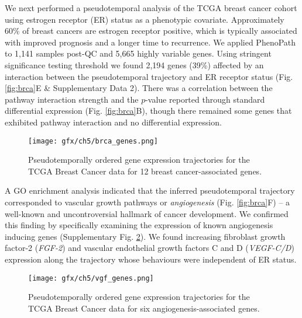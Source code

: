 We next performed a pseudotemporal analysis of the TCGA breast cancer cohort using estrogen receptor (ER) status as a phenotypic covariate. Approximately 60\% of breast cancers are estrogen receptor positive\cite{Early_Breast_Cancer_Trialists_Collaborative_Group_EBCTCG_undated-ux}, which is typically associated with improved prognosis and a longer time to recurrence\cite{Parl1984-fo}. We applied PhenoPath to 1,141 samples post-QC and 5,665 highly variable genes. Using stringent significance testing threshold we found 2,194 genes (39\%) affected by an interaction between the pseudotemporal trajectory and ER receptor status (Fig. \ref{fig:brca}E \& Supplementary Data 2).
 There was a correlation between the pathway interaction strength and the $p$-value reported through standard differential expression (Fig. \ref{fig:brca}B), though there remained some genes that exhibited pathway interaction and no differential expression.

\begin{figure}
   \texttt{[image: gfx/ch5/brca\_genes.png]}
   \caption{Pseudotemporally ordered gene expression trajectories for the TCGA Breast Cancer data for 12 breast cancer-associated genes.}
	\label{fig:brca_genes}
\end{figure}

A GO enrichment analysis indicated that the inferred pseudotemporal trajectory corresponded to vascular growth pathways or \emph{angiogenesis} (Fig. \ref{fig:brca}F) -- a well-known and uncontroversial hallmark of cancer development.\cite{ferrara2002vegf,welti2013recent} We confirmed this finding by specifically examining the expression of known angiogenesis inducing genes (Supplementary Fig. \ref{fig:vgf_genes}). We found increasing fibroblast growth factor-2 (\emph{FGF-2}) and vascular endothelial growth factors C and D (\emph{VEGF-C/D}) expression along the trajectory whose behaviours were independent of ER status.

\begin{figure}
   \texttt{[image: gfx/ch5/vgf\_genes.png]}
   \caption{Pseudotemporally ordered gene expression trajectories for the TCGA Breast Cancer data for six angiogenesis-associated genes.}
	\label{fig:vgf_genes}
\end{figure}

